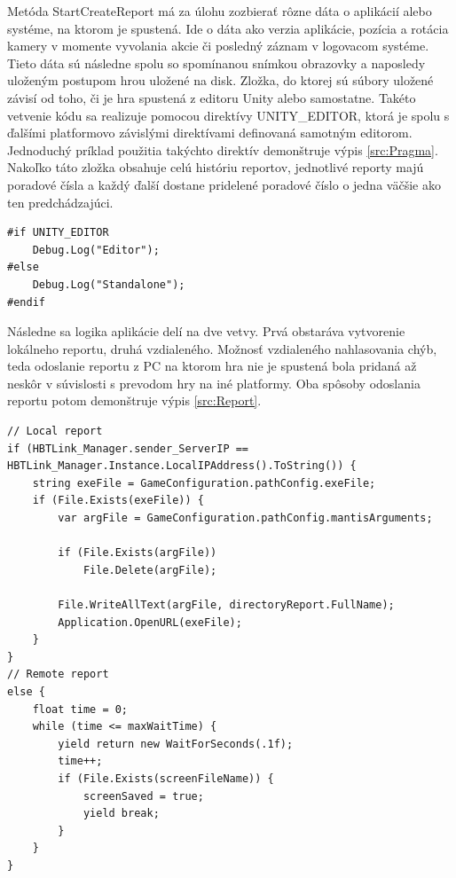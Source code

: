 \documentclass[slovak, bachelorpractice]{diploma}
\begin{document}
Metóda StartCreateReport má za úlohu zozbierať rôzne dáta o aplikácií alebo systéme, na ktorom je spustená. Ide o dáta ako verzia aplikácie, pozícia a rotácia kamery v momente vyvolania akcie či posledný záznam v logovacom systéme. Tieto dáta sú následne spolu so spomínanou snímkou obrazovky a naposledy uloženým postupom hrou uložené na disk. Zložka, do ktorej sú súbory uložené závisí od toho, či je hra spustená z editoru Unity alebo samostatne. Takéto vetvenie kódu sa realizuje pomocou direktívy UNITY\_EDITOR, ktorá je spolu s ďalšími platformovo závislými direktívami definovaná samotným editorom. Jednoduchý príklad použitia takýchto direktív demonštruje výpis \ref{src:Pragma}. Nakoľko táto zložka obsahuje celú históriu reportov, jednotlivé reporty majú poradové čísla a každý ďalší dostane pridelené poradové číslo o jedna väčšie ako ten predchádzajúci.
\vspace{10pt}
\begin{lstlisting}[label=src:Pragma,caption={Ukážka použitia direktívy UNITY\_EDITOR}]
#if UNITY_EDITOR
	Debug.Log("Editor");                
#else
    Debug.Log("Standalone");             
#endif
\end{lstlisting}

Následne sa logika aplikácie delí na dve vetvy. Prvá obstaráva vytvorenie lokálneho reportu, druhá vzdialeného. Možnosť vzdialeného nahlasovania chýb, teda odoslanie reportu z PC na ktorom hra nie je spustená bola pridaná až neskôr v súvislosti s prevodom hry na iné platformy. Oba spôsoby odoslania reportu potom demonštruje výpis \ref{src:Report}.
\vspace{10pt}
\begin{lstlisting}[label=src:Report,caption={Vytváranie lokálneho a vzdialeného reportu}]
// Local report
if (HBTLink_Manager.sender_ServerIP == HBTLink_Manager.Instance.LocalIPAddress().ToString()) {
    string exeFile = GameConfiguration.pathConfig.exeFile;
    if (File.Exists(exeFile)) {
        var argFile = GameConfiguration.pathConfig.mantisArguments;

        if (File.Exists(argFile))
            File.Delete(argFile);

        File.WriteAllText(argFile, directoryReport.FullName);
        Application.OpenURL(exeFile);
    }
}
// Remote report
else {
    float time = 0;
    while (time <= maxWaitTime) {
        yield return new WaitForSeconds(.1f);
        time++;
        if (File.Exists(screenFileName)) {
            screenSaved = true;
            yield break;
        }
    }
}
\end{lstlisting}
\end{document}
